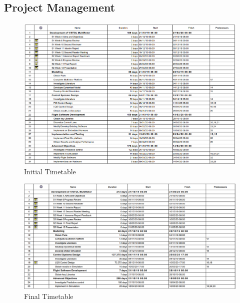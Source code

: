 \documentclass[12pt,a4paper,twoside]{report}
\begin{document}
		\subsection{Project Management}
			
			\begin{figure}[h!]
				\centering
				\includegraphics[width=1.1\linewidth]{ProjectInitialTimetable.png}
				\caption{Initial Timetable}
				\label{fig:initialtimetable}
			\end{figure}
		
			\begin{figure}[h!]
				\centering
				\includegraphics[width=1.1\linewidth]{ProjectFinalTimetable.png}
				\caption{Final Timetable}
				\label{fig:finaltimetable}
			\end{figure}
		
\end{document}
